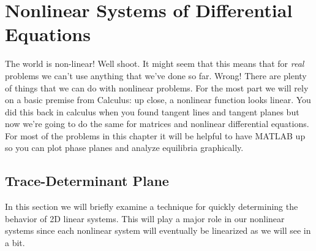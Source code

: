 \setcounter{chapter}{8}
\chapter{Nonlinear Systems of Differential Equations}
The world is non-linear!  Well shoot. It might seem that this means that for {\it real}
problems we can't use anything that we've done so far.   Wrong!  There are plenty of
things that we can do with nonlinear problems.  For the most part we will rely on a basic
premise from Calculus: up close, a nonlinear function looks linear. You did this back in
calculus when you found tangent lines and tangent planes but now we're going to do the
same for matrices and nonlinear differential equations.  For most of the problems in this
chapter it will be helpful to have MATLAB up so you can plot phase planes and analyze
equilibria graphically.


\section{Trace-Determinant Plane}
In this section we will briefly examine a technique for quickly determining
the behavior of 2D linear systems.  This will play a major role in our nonlinear systems
since each nonlinear system will eventually be linearized as we will see in a bit.  


